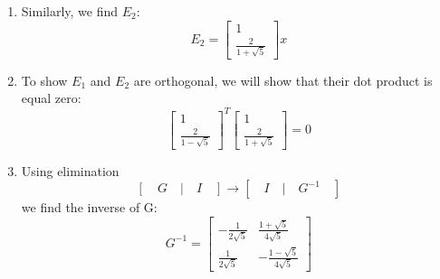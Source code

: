 \begin{enumerate}
    \item Similarly, we find \(E_2\):
    \[E_2 = 
    \begin{bmatrix}
    1 \\
    \frac{2}{1 + \sqrt{5}}
    \end{bmatrix}x \]
    
    \item To show \(E_1\) and \(E_2\) are orthogonal, we will show that their dot product is equal zero: \[ 
    \begin{bmatrix}
    1 \\
    \frac{2}{1 - \sqrt{5}}
    \end{bmatrix}^{T}
    \begin{bmatrix}
    1 \\
    \frac{2}{1 + \sqrt{5}}  
    \end{bmatrix} = 0
    \]
    
    
    \item Using elimination
    \[[ \quad G \quad | \quad I \quad] \rightarrow [\quad I \quad | \quad G^{-1} \quad] \] we find the inverse of G:
    \[G^{-1} =  \begin{bmatrix}
-\frac{1}{2 \sqrt{5}} & \frac{1+\sqrt{5}}{4 \sqrt{5}}\\
\frac{1}{2 \sqrt{5}} & -\frac{1-\sqrt{5}}{4 \sqrt{5}} 
\end{bmatrix}\]
    
    
    

\end{enumerate}
